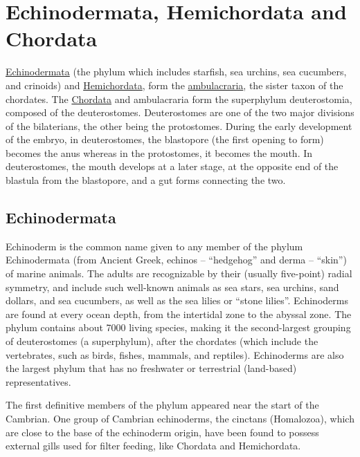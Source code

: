 \chapter{Echinodermata, Hemichordata and
Chordata}\label{echinodermata-hemichordata-and-chordata}

\href{https://en.wikipedia.org/wiki/Echinoderm}{Echinodermata} (the
phylum which includes starfish, sea urchins, sea cucumbers, and
crinoids) and
\href{https://en.wikipedia.org/wiki/Hemichordate}{Hemichordata}, form
the \href{https://en.wikipedia.org/wiki/Ambulacraria}{ambulacraria}, the
sister taxon of the chordates. The
\href{https://en.wikipedia.org/wiki/Chordate}{Chordata} and ambulacraria
form the superphylum deuterostomia, composed of the deuterostomes.
Deuterostomes are one of the two major divisions of the bilaterians, the
other being the protostomes. During the early development of the embryo,
in deuterostomes, the blastopore (the first opening to form) becomes the
anus whereas in the protostomes, it becomes the mouth. In deuterostomes,
the mouth develops at a later stage, at the opposite end of the blastula
from the blastopore, and a gut forms connecting the two.

\section{Echinodermata}\label{echinodermata}

Echinoderm is the common name given to any member of the phylum
Echinodermata (from Ancient Greek, echinos -- ``hedgehog'' and derma --
``skin'') of marine animals. The adults are recognizable by their
(usually five-point) radial symmetry, and include such well-known
animals as sea stars, sea urchins, sand dollars, and sea cucumbers, as
well as the sea lilies or ``stone lilies''. Echinoderms are found at
every ocean depth, from the intertidal zone to the abyssal zone. The
phylum contains about 7000 living species, making it the second-largest
grouping of deuterostomes (a superphylum), after the chordates (which
include the vertebrates, such as birds, fishes, mammals, and reptiles).
Echinoderms are also the largest phylum that has no freshwater or
terrestrial (land-based) representatives.

The first definitive members of the phylum appeared near the start of
the Cambrian. One group of Cambrian echinoderms, the cinctans
(Homalozoa), which are close to the base of the echinoderm origin, have
been found to possess external gills used for filter feeding, like
Chordata and Hemichordata.

